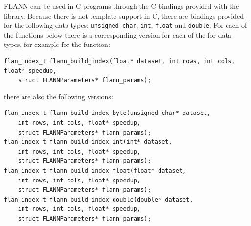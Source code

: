 \documentclass[letter,10pt]{article}
\begin{document}
FLANN can be used in C programs through the C bindings provided
with the library. Because there is not template support in C, there
are bindings provided for the following data types: \texttt{unsigned char},
\texttt{int}, \texttt{float} and \texttt{double}. For each of the functions 
below there is a corresponding version for each of the for data types, for example
for the function:
\begin{Verbatim}[fontsize=\footnotesize,frame=single]
flan_index_t flann_build_index(float* dataset, int rows, int cols, float* speedup,
	struct FLANNParameters* flann_params);
\end{Verbatim}
there are also the following versions:
\begin{Verbatim}[fontsize=\footnotesize,frame=single]
flan_index_t flann_build_index_byte(unsigned char* dataset,
	int rows, int cols, float* speedup,
	struct FLANNParameters* flann_params);
flan_index_t flann_build_index_int(int* dataset,
	int rows, int cols, float* speedup,
	struct FLANNParameters* flann_params);
flan_index_t flann_build_index_float(float* dataset,
	int rows, int cols, float* speedup,
	struct FLANNParameters* flann_params);
flan_index_t flann_build_index_double(double* dataset,
	int rows, int cols, float* speedup,
	struct FLANNParameters* flann_params);
\end{Verbatim}
\end{document}
